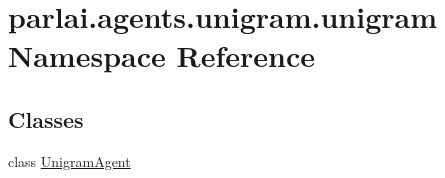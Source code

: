 \hypertarget{namespaceparlai_1_1agents_1_1unigram_1_1unigram}{}\section{parlai.\+agents.\+unigram.\+unigram Namespace Reference}
\label{namespaceparlai_1_1agents_1_1unigram_1_1unigram}
\subsection*{Classes}
\begin{DoxyCompactItemize}
\item 
class \hyperlink{classparlai_1_1agents_1_1unigram_1_1unigram_1_1UnigramAgent}{Unigram\+Agent}
\end{DoxyCompactItemize}
